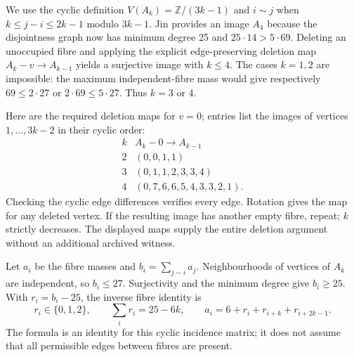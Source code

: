\documentclass[11pt,a4paper]{article}
\numberwithin{equation}{section}
\theoremstyle{remark}
\begin{document}
We use the cyclic definition $ V(A_k)=\mathbb Z/(3k-1)$ and
$ i\sim j $ when $ k\le j-i\le 2k-1$ modulo $3k-1$. Jin provides an
image $ A_4$ because the disjointness graph now has minimum degree 25 and
$25\cdot 14>5\cdot 69$. Deleting an unoccupied fibre and applying the
explicit edge-preserving deletion map $ A_k-v\to A_{k-1}$ yields a
surjective image with $ k\le 4$. The cases $ k=1,2$ are impossible: the
maximum independent-fibre mass would give respectively $69\le 2\cdot 27$
or $2\cdot 69\le 5\cdot 27$. Thus $ k=3$ or 4.

Here are the required deletion maps for $ v=0$; entries list the images
of vertices $1,\ldots,3k-2$ in their cyclic order:
\[
\begin{array}{c|l}
k& A_k-0\longrightarrow A_{k-1}\\\hline
2&(0,0,1,1)\\
3&(0,1,1,2,3,3,4)\\
4&(0,7,6,6,5,4,3,3,2,1).
\end{array}
\]
Checking the cyclic edge differences verifies every edge. Rotation
gives the map for any deleted vertex. If the resulting image has
another empty fibre, repeat; $ k $ strictly decreases. The displayed maps supply the entire deletion argument without an
additional archived witness.

Let $ a_i $ be the fibre masses and $ b_i=\sum_{j\sim i}a_j $.
Neighbourhoods of vertices of $ A_k $ are independent, so $ b_i\le 27$.
Surjectivity and the minimum degree give $ b_i\ge 25$. With
$ r_i=b_i-25$, the inverse fibre identity is
\[
 r_i\in\{0,1,2\},\qquad \sum_i r_i=25-6k,\qquad
 a_i=6+r_i+r_{i+k}+r_{i+2k-1}.
\]
The formula is an identity for this cyclic incidence matrix; it does
not assume that all permissible edges between fibres are present.
\end{document}
